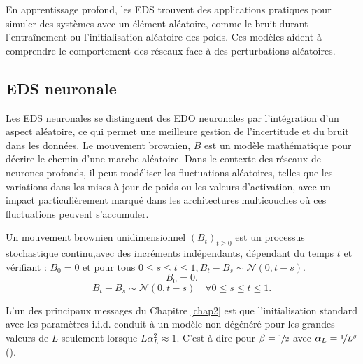 En apprentissage profond, les EDS trouvent des applications pratiques pour simuler des systèmes avec un élément aléatoire, comme le bruit durant l'entraînement ou l'initialisation aléatoire des poids. Ces modèles aident à comprendre le comportement des réseaux face à des perturbations aléatoires.

\subsection{EDS neuronale}
Les EDS neuronales se distinguent des EDO neuronales par l'intégration d'un aspect aléatoire, ce qui permet une meilleure gestion de l'incertitude et du bruit dans les données. Le mouvement brownien, $B$ est un modèle mathématique pour décrire le chemin d'une marche aléatoire. Dans le contexte des réseaux de neurones profonds, il peut modéliser les fluctuations aléatoires, telles que les variations dans les mises à jour de poids ou les valeurs d'activation, avec un impact particulièrement marqué dans les architectures multicouches où ces fluctuations peuvent s'accumuler.

\begin{definition}
Un mouvement brownien unidimensionnel $(B_t)_{t \geqslant 0} $ est un processus stochastique continu,avec des incréments indépendants, dépendant du temps $t$ et vérifiant : $B_0 = 0$ et pour tous $0 \leqslant s \le t \leqslant 1, B_t - B_s \sim \mathcal{N}(0,t-s)$.
\[
    B_0 = 0
.\]
\[
    B_t - B_s \sim \mathcal{N}(0,t-s)\quad \forall 0 \leqslant s \le t \leqslant 1
.\]
\end{definition}

L'un des principaux messages du Chapitre \ref{chap2} est que l'initialisation standard avec les paramètres i.i.d. conduit à un modèle non dégénéré pour les grandes valeurs de $L$ seulement lorsque $L\alpha_L^2 \approx 1$. C'est à dire pour $\beta = \nicefrac{1}{2}$ avec $\alpha_L=\nicefrac{1}{L^{\beta}}$ ().

